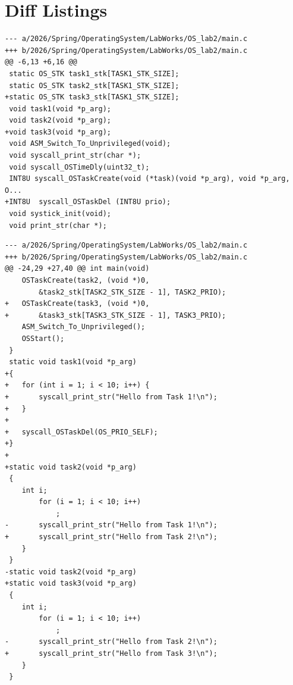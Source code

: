 \documentclass[12pt,a4paper]{article}
\begin{document}
\section*{Diff Listings}

\begin{lstlisting}[style=diffstyle,caption={main.c --- hunk -6 +6}]
--- a/2026/Spring/OperatingSystem/LabWorks/OS_lab2/main.c
+++ b/2026/Spring/OperatingSystem/LabWorks/OS_lab2/main.c
@@ -6,13 +6,16 @@
 static OS_STK task1_stk[TASK1_STK_SIZE];
 static OS_STK task2_stk[TASK1_STK_SIZE];
+static OS_STK task3_stk[TASK1_STK_SIZE];
 void task1(void *p_arg);
 void task2(void *p_arg);
+void task3(void *p_arg);
 void ASM_Switch_To_Unprivileged(void);
 void syscall_print_str(char *);
 void syscall_OSTimeDly(uint32_t);
 INT8U syscall_OSTaskCreate(void (*task)(void *p_arg), void *p_arg, O...
+INT8U  syscall_OSTaskDel (INT8U prio);
 void systick_init(void);
 void print_str(char *);
\end{lstlisting}

\begin{lstlisting}[style=diffstyle,caption={main.c --- hunk -24 +27}]
--- a/2026/Spring/OperatingSystem/LabWorks/OS_lab2/main.c
+++ b/2026/Spring/OperatingSystem/LabWorks/OS_lab2/main.c
@@ -24,29 +27,40 @@ int main(void)
 	OSTaskCreate(task2, (void *)0,
 		&task2_stk[TASK2_STK_SIZE - 1], TASK2_PRIO);
+	OSTaskCreate(task3, (void *)0,
+		&task3_stk[TASK3_STK_SIZE - 1], TASK3_PRIO);
 	ASM_Switch_To_Unprivileged();
 	OSStart();
 }
 static void task1(void *p_arg)
+{
+	for (int i = 1; i < 10; i++) {
+		syscall_print_str("Hello from Task 1!\n");
+	}
+
+	syscall_OSTaskDel(OS_PRIO_SELF);
+}
+
+static void task2(void *p_arg)
 {
 	int i;
 		for (i = 1; i < 10; i++)
 			;
-		syscall_print_str("Hello from Task 1!\n");
+		syscall_print_str("Hello from Task 2!\n");
 	}
 }
-static void task2(void *p_arg)
+static void task3(void *p_arg)
 {
 	int i;
 		for (i = 1; i < 10; i++)
 			;
-		syscall_print_str("Hello from Task 2!\n");
+		syscall_print_str("Hello from Task 3!\n");
 	}
 }
\end{lstlisting}
\end{document}
